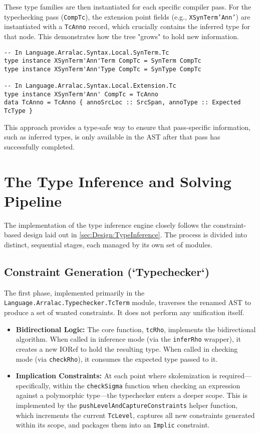 These type families are then instantiated for each specific compiler pass. For the typechecking pass (\texttt{CompTc}), the extension point fields (e.g., \texttt{XSynTerm'Ann'}) are instantiated with a \texttt{TcAnno} record, which crucially contains the inferred type for that node. This demonstrates how the tree "grows" to hold new information.

\begin{verbatim}
-- In Language.Arralac.Syntax.Local.SynTerm.Tc
type instance XSynTerm'Ann'Term CompTc = SynTerm CompTc
type instance XSynTerm'Ann'Type CompTc = SynType CompTc

-- In Language.Arralac.Syntax.Local.Extension.Tc
type instance XSynTerm'Ann' CompTc = TcAnno
data TcAnno = TcAnno { annoSrcLoc :: SrcSpan, annoType :: Expected TcType }
\end{verbatim}

This approach provides a type-safe way to ensure that pass-specific information, such as inferred types, is only available in the AST after that pass has successfully completed.

\section{The Type Inference and Solving Pipeline}
\label{sec:Implementation:Pipeline}

The implementation of the type inference engine closely follows the constraint-based design laid out in \cref{sec:Design:TypeInference}. The process is divided into distinct, sequential stages, each managed by its own set of modules.

\subsection{Constraint Generation (`Typechecker`)}
The first phase, implemented primarily in the \texttt{Language.Arralac.Typechecker.TcTerm} module, traverses the renamed AST to produce a set of wanted constraints. It does not perform any unification itself.
\begin{itemize}
    \item \textbf{Bidirectional Logic:} The core function, \texttt{tcRho}, implements the bidirectional algorithm. When called in inference mode (via the \texttt{inferRho} wrapper), it creates a new IORef to hold the resulting type. When called in checking mode (via \texttt{checkRho}), it consumes the expected type passed to it.

    \item \textbf{Implication Constraints:} At each point where skolemization is required---specifically, within the \texttt{checkSigma} function when checking an expression against a polymorphic type---the typechecker enters a deeper scope. This is implemented by the \texttt{pushLevelAndCaptureConstraints} helper function, which increments the current \texttt{TcLevel}, captures all new constraints generated within its scope, and packages them into an \texttt{Implic} constraint.
\end{itemize}

